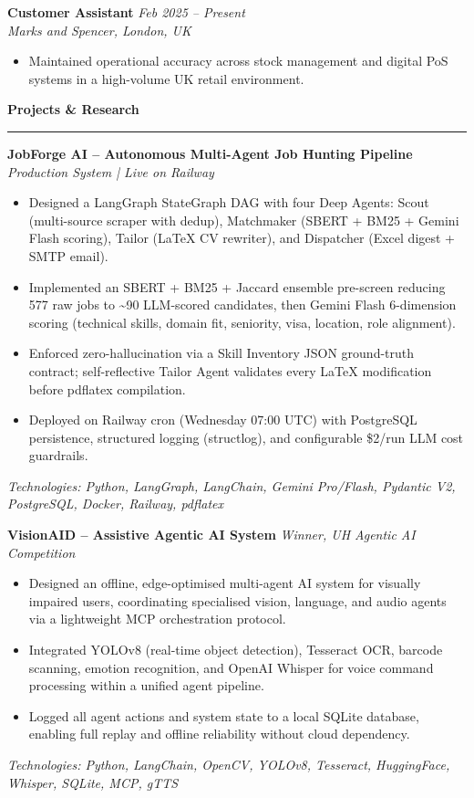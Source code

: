 \documentclass[a4paper,10pt]{article}
\newcommand{\sect}[1]{\vspace{8pt}\noindent\textbf{\color{heading}\large #1}\vspace{3pt}\hrule\vspace{6pt}}
\begin{document}
\noindent\textbf{Customer Assistant} \hfill \textit{Feb 2025 -- Present} \\
\textit{Marks and Spencer, London, UK}
\begin{itemize}[leftmargin=*, topsep=2pt, itemsep=1pt]
    \item Maintained operational accuracy across stock management and digital PoS systems in a high-volume UK retail environment.
\end{itemize}
\vspace{4pt}


\sect{Projects \& Research}

\noindent\textbf{JobForge AI -- Autonomous Multi-Agent Job Hunting Pipeline} \hfill \textit{Production System | Live on Railway}
\begin{itemize}[leftmargin=*, topsep=4pt, itemsep=2pt]
    \item Designed a LangGraph StateGraph DAG with four Deep Agents: Scout (multi-source scraper with dedup), Matchmaker (SBERT + BM25 + Gemini Flash scoring), Tailor (LaTeX CV rewriter), and Dispatcher (Excel digest + SMTP email).
    \item Implemented an SBERT + BM25 + Jaccard ensemble pre-screen reducing 577 raw jobs to \textasciitilde90 LLM-scored candidates, then Gemini Flash 6-dimension scoring (technical skills, domain fit, seniority, visa, location, role alignment).
    \item Enforced zero-hallucination via a Skill Inventory JSON ground-truth contract; self-reflective Tailor Agent validates every LaTeX modification before pdflatex compilation.
    \item Deployed on Railway cron (Wednesday 07:00 UTC) with PostgreSQL persistence, structured logging (structlog), and configurable \$2/run LLM cost guardrails.
\end{itemize}
\textit{Technologies: Python, LangGraph, LangChain, Gemini Pro/Flash, Pydantic V2, PostgreSQL, Docker, Railway, pdflatex}
\vspace{8pt}

\noindent\textbf{VisionAID -- Assistive Agentic AI System} \hfill \textit{Winner, UH Agentic AI Competition}
\begin{itemize}[leftmargin=*, topsep=4pt, itemsep=2pt]
    \item Designed an offline, edge-optimised multi-agent AI system for visually impaired users, coordinating specialised vision, language, and audio agents via a lightweight MCP orchestration protocol.
    \item Integrated YOLOv8 (real-time object detection), Tesseract OCR, barcode scanning, emotion recognition, and OpenAI Whisper for voice command processing within a unified agent pipeline.
    \item Logged all agent actions and system state to a local SQLite database, enabling full replay and offline reliability without cloud dependency.
\end{itemize}
\textit{Technologies: Python, LangChain, OpenCV, YOLOv8, Tesseract, HuggingFace, Whisper, SQLite, MCP, gTTS}
\vspace{8pt}
\end{document}
